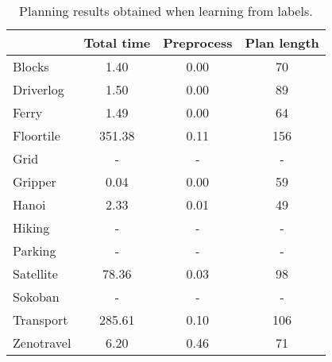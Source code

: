 \documentclass{article}
\begin{document}
\begin{table}
	\begin{footnotesize}
		\begin{center}
			\begin{tabular}{l|c|c|c|}			
				& Total time & Preprocess & Plan length  \\
				\hline
				Blocks & 1.40 & 0.00 & 70  \\
				Driverlog & 1.50 & 0.00 & 89 \\
				Ferry & 1.49 & 0.00 & 64 \\
				Floortile & 351.38 & 0.11 & 156 \\
				Grid & - & - & - \\ %
				Gripper & 0.04 & 0.00 & 59 \\
				Hanoi & 2.33 & 0.01 & 49  \\
				Hiking & - & - & - \\ %
				Parking & - & - & - \\ %
				Satellite & 78.36 & 0.03 & 98 \\
				Sokoban & - & - & - \\ %
				Transport & 285.61 & 0.10 & 106 \\
				Zenotravel & 6.20 & 0.46 & 71 \\
			\end{tabular}
		\end{center}
	\end{footnotesize}
 \caption{\small Planning results obtained when learning from labels.}
\label{fig:planlabels}
\end{table}







\end{document}

